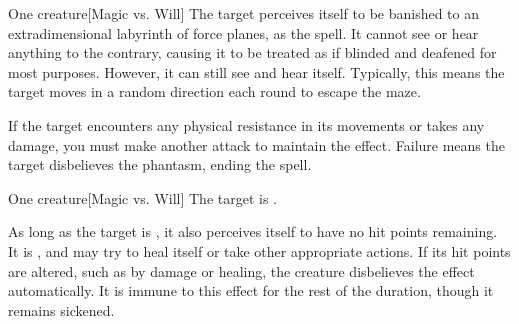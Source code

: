 \begin{spellheader}
    \spellrng{\rngmed}
    \spelldur{\durmed}
\end{spellheader}
\begin{spelleffects}
    \begin{spelltarget}{One creature}[Magic vs. Will]
        \spellsuccess The target perceives itself to be banished to an extradimensional labyrinth of force planes, as the  spell. It cannot see or hear anything to the contrary, causing it to be treated as if blinded and deafened for most purposes. However, it can still see and hear itself. Typically, this means the target moves in a random direction each round to escape the maze.

        If the target encounters any physical resistance in its movements or takes any damage, you must make another attack to maintain the effect. Failure means the target disbelieves the phantasm, ending the spell.
    \end{spelltarget}
\end{spelleffects}
\begin{spellfooter}
    
\end{spellfooter}

\begin{spellheader}
    \spellrng{\rngmed}
    \spelldur{\durshort}
\end{spellheader}
\begin{spelleffects}
    \begin{spelltarget}{One creature}[Magic vs. Will]
        \spellsuccess The target is \sickened.

        As long as the target is \bloodied, it also perceives itself to have no hit points remaining. It is \staggered, and may try to heal itself or take other appropriate actions. If its hit points are altered, such as by damage or healing, the creature disbelieves the effect automatically. It is immune to this effect for the rest of the duration, though it remains sickened.
    \end{spelltarget}
\end{spelleffects}
\begin{spellfooter}
    
\end{spellfooter}

